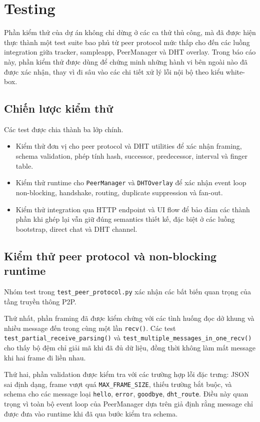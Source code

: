 \section{Testing}
Phần kiểm thử của dự án không chỉ dừng ở các ca thử thủ công, mà đã được hiện thực thành một test suite bao phủ từ peer protocol mức thấp cho đến các luồng integration giữa tracker, sampleapp, PeerManager và DHT overlay. Trong báo cáo này, phần kiểm thử được dùng để chứng minh những hành vi bên ngoài nào đã được xác nhận, thay vì đi sâu vào các chi tiết xử lý lỗi nội bộ theo kiểu white-box.

\subsection{Chiến lược kiểm thử}
Các test được chia thành ba lớp chính.
\begin{itemize}[leftmargin=2em]
    \item Kiểm thử đơn vị cho peer protocol và DHT utilities để xác nhận framing, schema validation, phép tính hash, successor, predecessor, interval và finger table.
    \item Kiểm thử runtime cho \texttt{PeerManager} và \texttt{DHTOverlay} để xác nhận event loop non-blocking, handshake, routing, duplicate suppression và fan-out.
    \item Kiểm thử integration qua HTTP endpoint và UI flow để bảo đảm các thành phần khi ghép lại vẫn giữ đúng semantics thiết kế, đặc biệt ở các luồng bootstrap, direct chat và DHT channel.
\end{itemize}

\subsection{Kiểm thử peer protocol và non-blocking runtime}
Nhóm test trong \texttt{test\_peer\_protocol.py} xác nhận các bất biến quan trọng của tầng truyền thông P2P.

Thứ nhất, phần framing đã được kiểm chứng với các tình huống đọc dở khung và nhiều message đến trong cùng một lần \texttt{recv()}. Các test \texttt{test\_partial\_receive\_parsing()} và \texttt{test\_multiple\_messages\_in\_one\_recv()} cho thấy bộ đệm chỉ giải mã khi đã đủ dữ liệu, đồng thời không làm mất message khi hai frame đi liền nhau.

Thứ hai, phần validation được kiểm tra với các trường hợp lỗi đặc trưng: JSON sai định dạng, frame vượt quá \texttt{MAX\_FRAME\_SIZE}, thiếu trường bắt buộc, và schema cho các message loại \texttt{hello}, \texttt{error}, \texttt{goodbye}, \texttt{dht\_route}. Điều này quan trọng vì toàn bộ event loop của PeerManager dựa trên giả định rằng message chỉ được đưa vào runtime khi đã qua bước kiểm tra schema.

